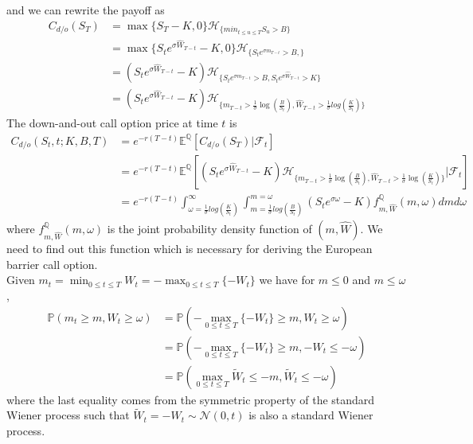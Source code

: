 and we can rewrite the payoff as  \cite{Eric}
\begin{align*}
C_{d/o}(S_T)&=\max\{S_T-K, 0\}\mathcal{H}_{\{min_{t\leq u\leq T}S_u > B\}}\\
&=\max\{S_te^{\sigma \widehat{W}_{T-t}}-K, 0\}\mathcal{H}_{\{S_te^{\sigma 	m_{T-t}} > B, \}}\\
&=(S_te^{\sigma \widehat{W}_{T-t}}-K)\mathcal{H}_{\{S_te^{\sigma m_{T-t}} > B, S_te^{\sigma \widehat{W}_{T-t}}> K\}}\\
&=(S_te^{\sigma \widehat{W}_{T-t}}-K)\mathcal{H}_{\{m_{T-t}>\frac{1}{\sigma}\log\left(\frac{B}{S_t}\right), \widehat{W}_{T-t}>\frac{1}{\sigma}log\left(\frac{K}{S_t}\right) \}}
\end{align*}
The down-and-out call option price at time $t$ is
\begin{align*}
	C_{d/o}(S_t,t;K,B,T) &= e^{-r(T-t)}\mathbb{E}^\mathbb{Q}[C_{d/o}(S_T)|\mathcal{F}_t]\\
	&=e^{-r(T-t)}\mathbb{E}^\mathbb{Q}[(S_te^{\sigma \widehat{W}_{T-t}}-K)\mathcal{H}_{\{m_{T-t}>\frac{1}{\sigma}\log\left(\frac{B}{S_t}\right), \widehat{W}_{T-t}>\frac{1}{\sigma}\log\left(\frac{K}{S_t}\right) \}}\bigg|\mathcal{F}_t]\\
	&=e^{-r(T-t)}\displaystyle \int_{\omega =\frac{1}{\sigma}log\left(\frac{K}{S_t}\right) }^{\infty}\displaystyle \int_{m =\frac{1}{\sigma}log\left(\frac{B}{S_t}\right) }^{m=\omega}(S_te^{\sigma \omega}-K)f^\mathbb{Q}_{m,\widehat{W}}(m, \omega)dmd\omega
\end{align*}
where $f^\mathbb{Q}_{m,\widehat{W}}(m, \omega)$ is the joint probability density function of $(m, \widehat{W})$. We need to find out this function which is necessary for deriving the European barrier call option. \\ [0.5cm]
Given $m_t=\displaystyle \min_{0\leq t\leq T} W_t =-\displaystyle \max_{0\leq t\leq T}\{-W_t\}$ we have for $m\leq 0$ and $m\leq \omega$,
\begin{align*}
	\mathbb{P}(m_t\geq m, W_t \geq \omega)&=\mathbb{P}\left(-\displaystyle \max_{0\leq t\leq T}\{-W_t\}\geq m, W_t\geq \omega\right)\\
	&=\mathbb{P}\left(-\displaystyle \max_{0\leq t\leq T}\{-W_t\}\geq m, -W_t\leq -\omega\right)\\
	&= \mathbb{P}\left(\displaystyle \max_{0\leq t\leq T}{\widetilde{W}_t}\leq -m, \widetilde{W}_t\leq -\omega\right)
\end{align*}
where the last equality comes from the symmetric property of the standard Wiener process such that $\widetilde{W}_t=-W_t \sim \mathcal{N}(0, t)$ is also a standard Wiener process.\\
